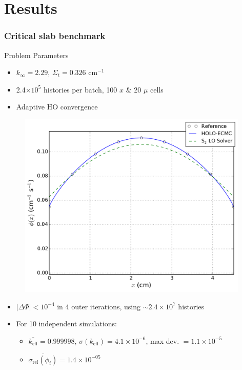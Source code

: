 \documentclass[xcolor=dvipsnames,handout,unknownkeysallowed]{beamer}
\newcommand{\keff}[0]{\ensuremath{{k}_{\textsf{eff}}} }
\newcommand{\coly}[1]{{\color{yellow} #1}}
\newlength{\wideitemsep}
\let\olditem\item
\renewcommand{\item}{\setlength{\itemsep}{\wideitemsep}\olditem}
\begin{document}
\section{Results}
\begin{frame}
    \frametitle{\coly{Critical slab benchmark}}
    \fontsize{9}{5.0}\selectfont
    \begin{block}{Problem Parameters}
    \begin{itemize}
        \item $k_\infty = 2.29$, $\Sigma_t = 0.326$ cm$^{-1}$
        \item 2.4$\times10^5$ histories per batch, 100 $x$ \& 20 $\mu$ cells
        \item Adaptive HO convergence
    \end{itemize}
    \end{block}
    \begin{minipage}{0.49\textwidth}
    \begin{figure}
    \centering
    \includegraphics[width=0.98\textwidth]{sood_fiss_src.pdf}
    \end{figure}
    \end{minipage}
    \begin{minipage}{0.49\textwidth}
    \begin{itemize}
        \item $|\Delta \Phi| < 10^{-4}$ in 4 outer iterations, using            $\sim2.4\times10^7$ histories
        \item For 10 independent simulations:
            \begin{itemize}
                \item  $\overline{\keff} = 0.999998$,
                    $\sigma(\keff)=4.1\times10^{-6}$, max dev. $=1.1\times10^{-5}$
                \item $\overline{\sigma_{\text{rel}}(\phi_i)} = 1.4\times10^{-05}$
            \end{itemize}
    \end{itemize}
    \end{minipage}
\end{frame}
\end{document}
